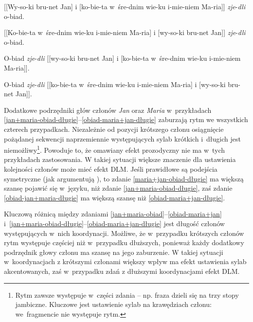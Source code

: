   \begin{exe}
\ex \label{jan+maria-obiad-długie} {
        {[[Wy-so-ki bru-net Jan] i [ko-bie-ta w~śre-dnim wie-ku i-mie-niem Ma-ria]] \textit{zje}-\textit{dli} o-biad.}
        }
        
\ex \label{maria+jan-obiad-długie} {
        {[[Ko-bie-ta w~śre-dnim wie-ku i-mie-niem Ma-ria] i [wy-so-ki bru-net Jan]] \textit{zje}-\textit{dli} o-biad.}
        }
        
\ex \label{obiad-jan+maria-długie} {
        {O-biad \textit{zje}-\textit{dli} [[wy-so-ki bru-net Jan] i [ko-bie-ta w~śre-dnim wie-ku i-mie-niem Ma-ria]].}
        }

\ex \label{obiad-maria+jan-długie} {
        {O-biad \textit{zje}-\textit{dli} [[ko-bie-ta w~śre-dnim wie-ku i-mie-niem Ma-ria] i [wy-so-ki bru-net Jan]].}
        }
\end{exe}      

Dodatkowe podrzędniki głów członów \textit{Jan} oraz \textit{Maria} w~przykładach \eqref{jan+maria-obiad-długie}--\eqref{obiad-maria+jan-długie} zaburzają rytm we wszystkich czterech przypadkach. Niezależnie od pozycji krótszego członu osiągnięcie pożądanej sekwencji naprzemiennie występujących sylab krótkich i~długich jest niemożliwy\footnote{
Rytm zawsze występuje w~części zdania -- np. fraza  dzieli się na trzy stopy jambiczne. Kluczowe jest ustawienie sylab na krawędziach członu: we~fragmencie  nie występuje rytm.}.
Powoduje to, że omawiany efekt prozodyczny nie ma w~tych przykładach zastosowania. W takiej sytuacji większe znaczenie dla ustawienia kolejności członów może mieć efekt DLM. Jeśli prawidłowe są podejścia symetryczne (jak argumentują \citealt{przepiorkowski2023conjunct}), to zdanie \eqref{maria+jan-obiad-długie} ma większą szansę pojawić się w~języku, niż zdanie \eqref{jan+maria-obiad-długie}, zaś zdanie \eqref{obiad-jan+maria-długie} ma większą szansę niż \eqref{obiad-maria+jan-długie}.

Kluczową różnicą między zdaniami \eqref{jan+maria-obiad}--\eqref{obiad-maria+jan} i~\eqref{jan+maria-obiad-długie}--\eqref{obiad-maria+jan-długie} jest długość członów występujących w~nich koordynacji. Możliwe, że w~przypadku krótszych członów rytm występuje częściej niż w~przypadku dłuższych, ponieważ każdy dodatkowy podrzędnik głowy członu ma szansę na jego zaburzenie. W takiej sytuacji w~koordynacjach z krótszymi członami większy wpływ ma efekt ustawienia sylab akcentowanych, zaś w~przypadku zdań z dłuższymi koordynacjami efekt DLM.

